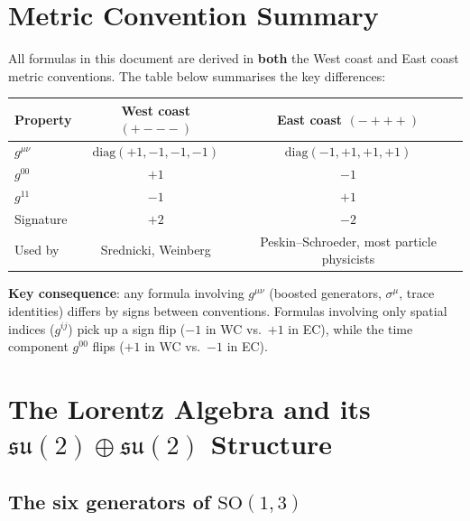 \section*{Metric Convention Summary}

All formulas in this document are derived in \textbf{both} the West coast and East coast
metric conventions. The table below summarises the key differences:

\medskip
\begin{center}
\renewcommand{\arraystretch}{1.4}
\begin{tabular}{@{}lcc@{}}
  \toprule
  Property & West coast $(+{-}{-}{-})$ & East coast $(-{+}{+}{+})$ \\
  \midrule
  $g^{\mu\nu}$ & $\mathrm{diag}(+1,-1,-1,-1)$ & $\mathrm{diag}(-1,+1,+1,+1)$ \\
  $g^{00}$ & $+1$ & $-1$ \\
  $g^{11}$ & $-1$ & $+1$ \\
  Signature & $+2$ & $-2$ \\
  Used by & Srednicki, Weinberg & Peskin--Schroeder, most particle physicists \\
  \bottomrule
\end{tabular}
\end{center}
\medskip

\noindent\textbf{Key consequence}: any formula involving $g^{\mu\nu}$ (boosted generators,
$\sigma^\mu$, trace identities) differs by signs between conventions.
Formulas involving only spatial indices ($g^{ij}$) pick up a sign flip
($-1$ in WC vs.\ $+1$ in EC), while the time component $g^{00}$ flips
($+1$ in WC vs.\ $-1$ in EC).

\tableofcontents
\newpage

\section{The Lorentz Algebra and its
  \texorpdfstring{$\mathfrak{su}(2)\oplus\mathfrak{su}(2)$}{su(2)+su(2)}
  Structure}

\subsection{The six generators of \texorpdfstring{$\mathrm{SO}(1,3)$}{SO(1,3)}}


